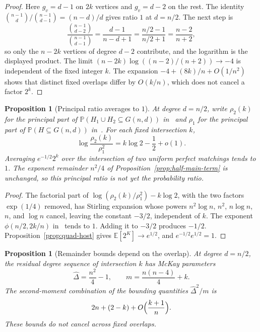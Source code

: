 \documentclass[11pt]{article}
\newtheorem{proposition}[theorem]{Proposition}
\newcommand{\EE}{\mathbb{E}}
\newcommand{\PP}{\mathbb{P}}
\begin{document}
\begin{proof}
Here \(g_v=d-1\) on \(2k\) vertices and \(g_v=d-2\) on the rest.
The identity \(\binom{n-1}{d}/\binom{n-1}{d-1}=(n-d)/d\) gives ratio \(1\) at \(d=n/2\).
The next step is
\[
\frac{\binom{n-1}{d-2}}{\binom{n-1}{d-1}}=\frac{d-1}{n-d+1}=\frac{n/2-1}{n/2+1}=\frac{n-2}{n+2},
\]
so only the \(n-2k\) vertices of degree \(d-2\) contribute, and the logarithm is the displayed product.
The limit \((n-2k)\log((n-2)/(n+2))\to -4\) is independent of the fixed integer \(k\).
The expansion \(-4+(8k)/n+O(1/n^2)\) shows that distinct fixed overlaps differ by \(O(k/n)\), which does not cancel a factor \(2^k\).
\end{proof}

\begin{proposition}[Principal ratio averages to \(1\)]
\label{prop:principal-average}
At degree \(d=n/2\), write \(\rho_2(k)\) for the principal part of \(\PP(H_1\cup H_2\subseteq G(n,d))\) in~\cite[display~(14)]{Gao21} and \(\rho_1\) for the principal part of \(\PP(H\subseteq G(n,d))\) in~\cite[display~(12)]{Gao21}.
For each fixed intersection \(k\),
\[
\log\frac{\rho_2(k)}{\rho_1^2}=k\log 2-\frac12+o(1).
\]
Averaging \(e^{-1/2}2^{k}\) over the intersection of two uniform perfect matchings tends to \(1\).
The exponent remainder \(n^2/4\) of Proposition~\ref{prop:half-main-term} is unchanged, so this principal ratio is not yet the probability ratio.
\end{proposition}

\begin{proof}
The factorial part of \(\log(\rho_2(k)/\rho_1^2)-k\log 2\), with the two factors \(\exp(1/4)\) removed, has Stirling expansion whose powers \(n^2\log n\), \(n^2\), \(n\log n\), \(n\), and \(\log n\) cancel, leaving the constant \(-3/2\), independent of \(k\).
The exponent \(\phi(n/2,2k/n)\) in~\cite[display~(8)]{Gao21} tends to \(1\).
Adding it to \(-3/2\) produces \(-1/2\).
Proposition~\ref{prop:quad-host} gives \(\EE[2^{K}]\to e^{1/2}\), and \(e^{-1/2}e^{1/2}=1\).
\end{proof}

\begin{proposition}[Remainder bounds depend on the overlap]
\label{prop:remainder-split}
At degree \(d=n/2\), the residual degree sequence of intersection \(k\) has McKay parameters
\[
\hat\Delta=\frac{n^2}{4}-1,\qquad m=\frac{n(n-4)}{4}+k.
\]
The second-moment combination of the bounding quantities \(\hat\Delta^2/m\) is
\[
2n+(2-k)+O\Bigl(\frac{k+1}{n}\Bigr).
\]
These bounds do not cancel across fixed overlaps.
\end{proposition}
\end{document}
